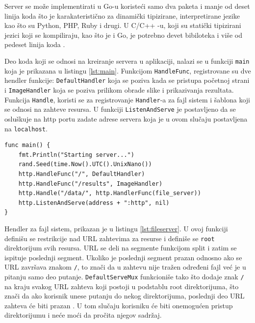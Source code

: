 \documentclass[12pt,oneside]{memoir}
\begin{document}
Server se može implementirati u Go-u  koristeći samo dva paketa i manje od deset linija koda što je karakateristično za dinamički tipizirane, interpretirane jezike kao što su Python, PHP, Ruby i drugi. U C/C++ -u, koji su statički tipizirani jezici koji se kompiliraju, kao što je i Go, je potrebno devet bibiloteka i više od pedeset linija koda \cite{server}.

Deo koda koji se odnosi na kreiranje servera u aplikaciji, nalazi se u funkciji \texttt{main} koja je prikazana u listingu \ref{lst:main}. Funkcijom \texttt{HandleFunc}, registrovane su dve hendler funkcije: \texttt{DefaultHandler} koja se poziva kada se pristupa početnoj strani i \texttt{ImageHandler} koja se poziva prilikom obrade slike i prikazivanja rezultata. Funkcija \texttt{Handle}, koristi se za registrovanje \texttt{Handler}-a za fajl sistem i šablona koji se odnosi na zahteve resursa.  U funkciji \texttt{ListenAndServe} je postavljeno da se osluškuje na http portu zadate adrese servera koja je u ovom slučaju postavljena na \texttt{localhost}.

\begin{center}
\begin{lstlisting}[caption={Funkcija \texttt{main}, kreiranje servera},label={lst:main},  backgroundcolor=\color{background},belowskip=-0.7 \baselineskip ]
func main() {
	fmt.Println("Starting server...")
	rand.Seed(time.Now().UTC().UnixNano())
	http.HandleFunc("/", DefaultHandler)
	http.HandleFunc("/results", ImageHandler)
	http.Handle("/data/", http.HandlerFunc(file_server))
	http.ListenAndServe(address + ":http", nil)
}
\end{lstlisting}
\end{center}

\label{fileserver}Hendler za fajl sistem, prikazan je u listingu \ref{lst:fileserver}. U ovoj funkciji definišu se restrikcije nad URL zahtevima za resurse i definiše se \texttt{root} direktorijum svih resursa. URL se deli na segmente funkcijom split i zatim se ispituje poslednji segment. Ukoliko je poslednji segment prazan odnosno ako se URL završava znakom \texttt{/}, to znači da u zahtevu nije tražen određeni fajl već je u pitanju samo deo putanje. \texttt{DefaultServeMux} funkcioniše tako što dodaje znak \texttt{/} na kraju svakog URL zahteva koji postoji u podstablu root direktorijuma, što znači da ako korisnik unese putanju do nekog direktorijuma, poslednji deo URL zahteva će biti prazan \cite{http}. U tom slučaju korisniku će biti onemogućen pristup direktorijumu i neće moći da pročita njegov sadržaj.
\end{document}
